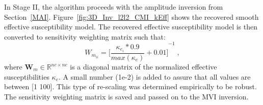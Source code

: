 In Stage II, the algorithm proceeds with the amplitude inversion from Section~\ref{MAI}.
Figure~\ref{fig:3D_Inv_l2l2_CMI_kEff} shows the recovered smooth effective susceptibility model.
The recovered effective susceptibility model is then converted to sensitivity weighting matrix such that:
\begin{equation}\label{W_M}
{W}_{m_{ii}} =  {\Big[\frac{\kappa_{e_i} *0.9 }{max(\kappa_{e})} + 0.01\Big]}^{-1}  \;,
\end{equation} 
 where $\mathbf{W}_m \in \mathbb{R}^{nc \times nc}$ is a diagonal matrix of the normalized effective susceptibilities $\kappa_{e}$. A small number (1e-2) is added to assure that all values are between [1 100].
 This type of re-scaling was determined empirically to be robust. 
The sensitivity weighting matrix is saved and passed on to the MVI inversion.

